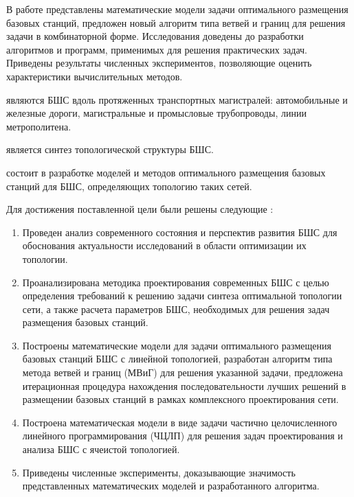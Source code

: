 В работе представлены математические модели задачи оптимального размещения базовых станций, предложен новый алгоритм типа ветвей и границ для решения задачи в комбинаторной форме.
Исследования доведены до разработки алгоритмов и программ, применимых для решения практических задач. Приведены результаты численных экспериментов, позволяющие оценить характеристики вычислительных методов.


{\objectresearch} являются БШС вдоль протяженных транспортных магистралей: автомобильные и железные дороги, магистральные и промысловые трубопроводы, линии метрополитена. 


{\subjectresearch} является синтез топологической структуры БШС.

{\aim} состоит в разработке моделей и методов оптимального размещения базовых станций для БШС, определяющих топологию таких сетей.

Для достижения поставленной цели были решены следующие {\tasks}:
\begin{enumerate}[beginpenalty=10000] %
  \item Проведен анализ современного состояния и перспектив развития БШС для  обоснования  актуальности исследований в области оптимизации их топологии. 
  \item Проанализирована методика проектирования современных БШС с целью определения требований к решению задачи синтеза оптимальной топологии сети, а также расчета параметров БШС, необходимых для решения задач размещения базовых станций.
  \item Построены математические модели для задачи оптимального размещения базовых станций БШС с линейной топологией, разработан алгоритм типа метода ветвей и границ (МВиГ) для решения указанной задачи, предложена итерационная процедура нахождения последовательности лучших решений в размещении базовых станций в рамках комплексного проектирования сети.
  \item Построена математическая модели в виде задачи частично целочисленного линейного программирования (ЧЦЛП) для решения задач проектирования и анализа БШС с ячеистой топологией.
  \item Приведены численные эксперименты, доказывающие значимость представленных математических моделей и разработанного алгоритма.

\end{enumerate}

